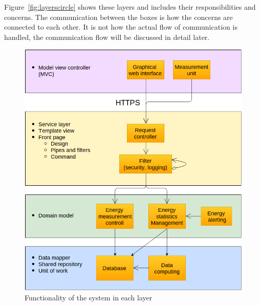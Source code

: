 


Figure~\ref{fig:layerscircle} shows these layers and includes their responsibilities and concerns. The communication between the boxes is how the concerns are connected to each other. It is not how the actual flow of communication is handled, the communication flow will be discussed in detail later.

\begin{figure}[H]
\centering
\includegraphics[scale=0.45]{7-software/images/layersflow.png}
\caption{Functionality of the system in each layer}
\label{fig:layersflow}
\end{figure}

